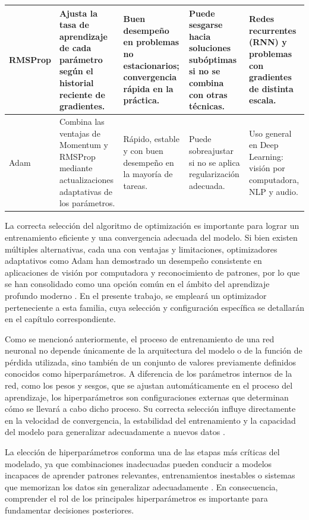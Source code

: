 \begin{longtable}{|p{2.0cm}|p{3.0cm}|p{2.5cm}|p{2.5cm}|p{2.5cm}|}
		RMSProp &
		Ajusta la tasa de aprendizaje de cada parámetro según el historial reciente de gradientes. &
		Buen desempeño en problemas no estacionarios; convergencia rápida en la práctica. &
		Puede sesgarse hacia soluciones subóptimas si no se combina con otras técnicas. &
		Redes recurrentes (RNN) y problemas con gradientes de distinta escala. \\
		\hline
		
		Adam &
		Combina las ventajas de Momentum y RMSProp mediante actualizaciones adaptativas de los parámetros. &
		Rápido, estable y con buen desempeño en la mayoría de tareas. &
		Puede sobreajustar si no se aplica regularización adecuada. &
		Uso general en Deep Learning: visión por computadora, NLP y audio. \\
		\hline
		
	\end{longtable}
	
	La correcta selección del algoritmo de optimización es importante para lograr un entrenamiento eficiente y una convergencia adecuada del modelo. Si bien existen múltiples alternativas, cada una con ventajas y limitaciones, optimizadores adaptativos como Adam han demostrado un desempeño consistente en aplicaciones de visión por computadora y reconocimiento de patrones, por lo que se han consolidado como una opción común en el ámbito del aprendizaje profundo moderno \cite{ruder2016overview, loshchilov2019adamw, tieleman2012rmsprop}. En el presente trabajo, se empleará un optimizador perteneciente a esta familia, cuya selección y configuración específica se detallarán en el capítulo correspondiente.
	
	Como se mencionó anteriormente, el proceso de entrenamiento de una red neuronal no depende únicamente de la arquitectura del modelo o de la función de pérdida utilizada, sino también de un conjunto de valores previamente definidos conocidos como hiperparámetros. A diferencia de los parámetros internos de la red, como los pesos y sesgos, que se ajustan automáticamente en el proceso del aprendizaje, los hiperparámetros son configuraciones externas que determinan cómo se llevará a cabo dicho proceso. Su correcta selección influye directamente en la velocidad de convergencia, la estabilidad del entrenamiento y la capacidad del modelo para generalizar adecuadamente a nuevos datos \cite{bishop2006, goodfellow2016dl}.
	
	La elección de hiperparámetros conforma una de las etapas más críticas del modelado, ya que combinaciones inadecuadas pueden conducir a modelos incapaces de aprender patrones relevantes, entrenamientos inestables o sistemas que memorizan los datos sin generalizar adecuadamente \cite{chollet2021, geron2019}. En consecuencia, comprender el rol de los principales hiperparámetros es importante para fundamentar decisiones posteriores.
	
